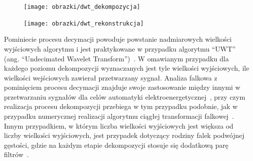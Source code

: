 \begin{figure}[htb!]
\begin{center}
\texttt{[image: obrazki/dwt\_dekompozycja]}
\end{center}
\end{figure}

\begin{figure}[htb!]
\begin{center}
\texttt{[image: obrazki/dwt\_rekonstrukcja]}
\end{center}
\end{figure}

Pominiecie procesu decymacji powoduje powstanie nadmiarowych wielkości wyjściowych algorytmu i jest praktykowane w przypadku algorytmu \enquote{UWT} (ang. \enquote{Undecimated Wavelet Transform})~\cite{lord_guide}. W omawianym przypadku dla każdego poziomu dekompozycji wyznaczanych jest tyle wielkości wyjściowych, ile wielkości wejściowych zawierał przetwarzany sygnał. Analiza falkowa z pominięciem procesu decymacji znajduje swoje zastosowanie między innymi w przetwarzaniu sygnałów dla celów automatyki elektroenergetycznej~\cite{niedopytalski_ene}, przy czym realizacja procesu dekompozycji przebiega w tym przypadku podobnie, jak w przypadku numerycznej realizacji algorytmu ciągłej transformacji falkowej~\cite{lord_guide}. Innym przypadkiem, w którym liczba wielkości wyjściowych jest większa od liczby wielkości wyjściowych, jest przypadek dotyczący rodziny falek podwójnej gęstości, gdzie na każdym etapie dekompozycji stosuje się dodatkową parę filtrów~\cite{selenick_ddenusage}.

